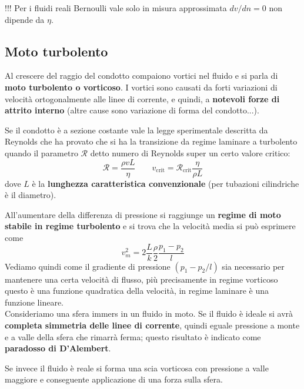 \documentclass[x11names]{report}
\begin{document}
	\begin{center}
		\colorbox{attenzione}{\begin{minipage}{5.75in}
				\begin{attenzione}{!!!}
					Per i fluidi reali Bernoulli vale solo in misura approssimata  \(dv/dn = 0\) non dipende da \(\eta\).
				\end{attenzione}
		\end{minipage}}
	\end{center}
	
	\subsection{Moto turbolento}
	Al crescere del raggio del condotto compaiono vortici nel fluido e si parla di \textbf{moto turbolento o vorticoso}. I vortici sono causati da forti variazioni di velocità ortogonalmente alle linee di corrente, e quindi, a \textbf{notevoli forze di attrito interno} (altre cause sono variazione di forma del condotto...).
	
	Se il condotto è a sezione costante vale la legge sperimentale descritta da Reynolds che ha provato che si ha la transizione da regime laminare a turbolento quando il parametro \(\mathcal{R}\) detto numero di Reynolds super un certo valore critico:
	\[ 
	\mathcal{R} = \frac{\rho v L}{\eta} \qquad  v_{\text{crit}} = \mathcal{R}_{\text{crit}}\frac{\eta}{\rho L}
	\]
	dove \(L\) è la \textbf{lunghezza caratteristica convenzionale} (per tubazioni cilindriche è il diametro).
	
	All'aumentare della differenza di pressione si raggiunge un \textbf{regime di moto stabile in regime turbolento} e si trova che la velocità media si può esprimere come
	\[ 
	v_{m}^2 = 2\frac{L}{k}\frac{\rho }{2} \frac{p_{1} - p_{2}}{l} 
	\]
	Vediamo quindi come il gradiente di pressione \((p_{1}-p_{2}/l)\) sia necessario per mantenere una certa velocità di flusso, più precisamente in regime vorticoso questo è una funzione quadratica della velocità, in regime laminare è una funzione lineare. \\
	
	\noindent
	Consideriamo una sfera immers in un fluido in moto. Se il fluido è ideale si avrà \textbf{completa simmetria delle linee di corrente}, quindi eguale pressione a monte e a valle della sfera che rimarrà ferma; questo risultato è indicato come \textbf{paradosso di D'Alembert}. 
	
	Se invece il fluido è reale si forma una scia vorticosa con pressione a valle maggiore e conseguente applicazione di una forza sulla sfera.
	
\end{document}
